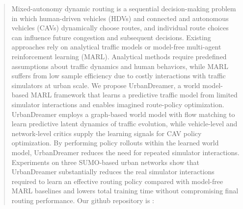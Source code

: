 \begin{abstract}
Mixed-autonomy dynamic routing is a sequential decision-making problem in which human-driven vehicles (HDVs) and connected and autonomous vehicles (CAVs) dynamically choose routes, and individual route choices can influence future congestion and subsequent decisions. Existing approaches rely on analytical traffic models or model-free multi-agent reinforcement learning (MARL). Analytical methods require predefined assumptions about traffic dynamics and human behaviors, while MARL suffers from low sample efficiency due to costly interactions with traffic simulators at urban scale. We propose UrbanDreamer, a world model-based MARL framework that learns a predictive traffic model from limited simulator interactions and enables imagined route-policy optimization. UrbanDreamer employs a graph-based world model with flow matching to learn predictive latent dynamics of traffic evolution, while vehicle-level and network-level critics supply the learning signals for CAV policy optimization. By performing policy rollouts within the learned world model, UrbanDreamer reduces the need for repeated simulator interactions. Experiments on three SUMO-based urban networks show that UrbanDreamer substantially reduces the real simulator interactions required to learn an effective routing policy compared with model-free MARL baselines and lowers total training time without compromising final routing performance. Our github repository is : \codelink
\end{abstract}